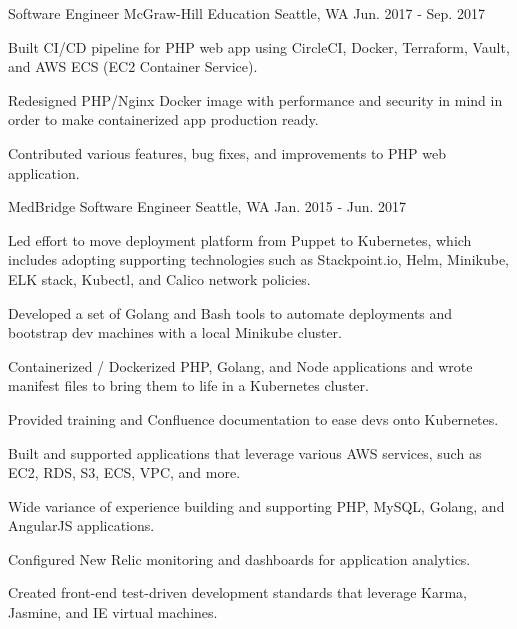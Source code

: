 \begin{cventries}
\cventry
{Software Engineer} %
{McGraw-Hill Education} %
{Seattle, WA} %
{Jun. 2017 - Sep. 2017} %
{ %
\begin{cvitems}
\item {Built CI/CD pipeline for PHP web app using CircleCI, Docker, Terraform, Vault, and AWS ECS (EC2 Container Service).}
\item {Redesigned PHP/Nginx Docker image with performance and security in mind in order to make containerized app production ready.}
\item {Contributed various features, bug fixes, and improvements to PHP web application.}
\end{cvitems}
}


\cventry
{MedBridge} %
{Software Engineer} %
{Seattle, WA} %
{Jan. 2015 - Jun. 2017} %
{ %
\begin{cvitems}
\item {Led effort to move deployment platform from Puppet to Kubernetes, which includes adopting supporting technologies such as Stackpoint.io, Helm, Minikube, ELK stack, Kubectl, and Calico network policies.}
\item {Developed a set of Golang and Bash tools to automate deployments and bootstrap dev machines with a local Minikube cluster.}
\item {Containerized / Dockerized PHP, Golang, and Node applications and wrote manifest files to bring them to life in a Kubernetes cluster.}
\item {Provided training and Confluence documentation to ease devs onto Kubernetes.}
\item {Built and supported applications that leverage various AWS services, such as EC2, RDS, S3, ECS, VPC, and more.}
\item {Wide variance of experience building and supporting PHP, MySQL, Golang, and AngularJS applications.}
\item {Configured New Relic monitoring and dashboards for application analytics.}
\item {Created front-end test-driven development standards that leverage Karma, Jasmine, and IE virtual machines.}
\end{cvitems} 
}



\end{cventries}

